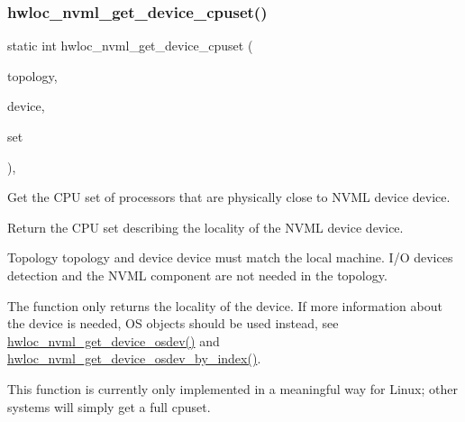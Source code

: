 \subsubsection{\texorpdfstring{hwloc\+\_\+nvml\+\_\+get\+\_\+device\+\_\+cpuset()}{hwloc\_nvml\_get\_device\_cpuset()}}
{\footnotesize\ttfamily static int hwloc\+\_\+nvml\+\_\+get\+\_\+device\+\_\+cpuset (\begin{DoxyParamCaption}\item[{\hyperlink{a00186_ga9d1e76ee15a7dee158b786c30b6a6e38}{hwloc\+\_\+topology\+\_\+t}}]{topology,  }\item[{nvml\+Device\+\_\+t}]{device,  }\item[{\hyperlink{a00183_ga4bbf39b68b6f568fb92739e7c0ea7801}{hwloc\+\_\+cpuset\+\_\+t}}]{set }\end{DoxyParamCaption})\hspace{0.3cm}{\ttfamily [inline]}, {\ttfamily [static]}}



Get the C\+PU set of processors that are physically close to N\+V\+ML device {\ttfamily device}. 

Return the C\+PU set describing the locality of the N\+V\+ML device {\ttfamily device}.

Topology {\ttfamily topology} and device {\ttfamily device} must match the local machine. I/O devices detection and the N\+V\+ML component are not needed in the topology.

The function only returns the locality of the device. If more information about the device is needed, OS objects should be used instead, see \hyperlink{a00221_gaf176159b5760a191871eff23f5a69ee9}{hwloc\+\_\+nvml\+\_\+get\+\_\+device\+\_\+osdev()} and \hyperlink{a00221_gacd50fd0e2766ee05bc13234b46714756}{hwloc\+\_\+nvml\+\_\+get\+\_\+device\+\_\+osdev\+\_\+by\+\_\+index()}.

This function is currently only implemented in a meaningful way for Linux; other systems will simply get a full cpuset. \mbox{\label{a00221_gaf176159b5760a191871eff23f5a69ee9}} 
